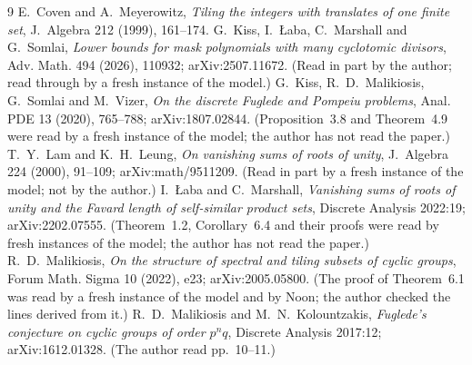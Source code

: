 \documentclass[11pt,a4paper]{amsart}
\theoremstyle{definition}
\theoremstyle{remark}
\begin{document}
\begin{thebibliography}{9}
 E.~Coven and A.~Meyerowitz, \emph{Tiling the integers with translates of one finite set},
 J.~Algebra 212 (1999), 161--174.
 G.~Kiss, I.~{\L}aba, C.~Marshall and G.~Somlai, \emph{Lower bounds for mask polynomials with many
cyclotomic divisors}, Adv. Math. 494 (2026), 110932; arXiv:2507.11672. (Read in part by the author; read
 through by a fresh instance of the model.)
 G.~Kiss, R.~D.~Malikiosis, G.~Somlai and M.~Vizer, \emph{On the discrete Fuglede and Pompeiu
 problems}, Anal. PDE 13 (2020), 765--788; arXiv:1807.02844. (Proposition~3.8 and Theorem~4.9 were read by a
 fresh instance of the model; the author has not read the paper.)
 T.~Y.~Lam and K.~H.~Leung, \emph{On vanishing sums of roots of unity}, J.~Algebra 224 (2000),
 91--109; arXiv:math/9511209. (Read in part by a fresh instance of the model; not by the author.)
 I.~{\L}aba and C.~Marshall, \emph{Vanishing sums of roots of unity and the Favard length of
 self-similar product sets}, Discrete Analysis 2022:19; arXiv:2202.07555. (Theorem~1.2, Corollary~6.4 and
 their proofs were read by fresh instances of the model; the author has not read the paper.)
 R.~D.~Malikiosis, \emph{On the structure of spectral and tiling subsets of cyclic groups}, Forum
 Math. Sigma 10 (2022), e23; arXiv:2005.05800. (The proof of Theorem~6.1 was read by a fresh instance of the
 model and by Noon; the author checked the lines derived from it.)
 R.~D.~Malikiosis and M.~N.~Kolountzakis, \emph{Fuglede's conjecture on cyclic groups of order
 $p^nq$}, Discrete Analysis 2017:12; arXiv:1612.01328. (The author read pp.~10--11.)
\end{thebibliography}
\end{document}
